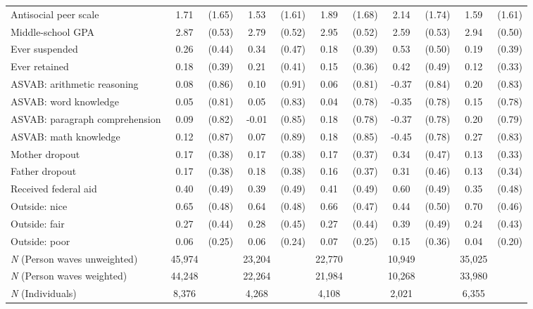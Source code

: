 {\begin{tabular}{l*{5}{cc}}
Antisocial peer scale&     1.71&   (1.65)&     1.53&   (1.61)&     1.89&   (1.68)&     2.14&   (1.74)&     1.59&   (1.61)\\
Middle-school GPA&     2.87&   (0.53)&     2.79&   (0.52)&     2.95&   (0.52)&     2.59&   (0.53)&     2.94&   (0.50)\\
Ever suspended  &     0.26&   (0.44)&     0.34&   (0.47)&     0.18&   (0.39)&     0.53&   (0.50)&     0.19&   (0.39)\\
Ever retained   &     0.18&   (0.39)&     0.21&   (0.41)&     0.15&   (0.36)&     0.42&   (0.49)&     0.12&   (0.33)\\
ASVAB: arithmetic reasoning&     0.08&   (0.86)&     0.10&   (0.91)&     0.06&   (0.81)&    -0.37&   (0.84)&     0.20&   (0.83)\\
ASVAB: word knowledge&     0.05&   (0.81)&     0.05&   (0.83)&     0.04&   (0.78)&    -0.35&   (0.78)&     0.15&   (0.78)\\
ASVAB: paragraph comprehension&     0.09&   (0.82)&    -0.01&   (0.85)&     0.18&   (0.78)&    -0.37&   (0.78)&     0.20&   (0.79)\\
ASVAB: math knowledge&     0.12&   (0.87)&     0.07&   (0.89)&     0.18&   (0.85)&    -0.45&   (0.78)&     0.27&   (0.83)\\
Mother dropout  &     0.17&   (0.38)&     0.17&   (0.38)&     0.17&   (0.37)&     0.34&   (0.47)&     0.13&   (0.33)\\
Father dropout  &     0.17&   (0.38)&     0.18&   (0.38)&     0.16&   (0.37)&     0.31&   (0.46)&     0.13&   (0.34)\\
Received federal aid&     0.40&   (0.49)&     0.39&   (0.49)&     0.41&   (0.49)&     0.60&   (0.49)&     0.35&   (0.48)\\
Outside: nice   &     0.65&   (0.48)&     0.64&   (0.48)&     0.66&   (0.47)&     0.44&   (0.50)&     0.70&   (0.46)\\
Outside: fair   &     0.27&   (0.44)&     0.28&   (0.45)&     0.27&   (0.44)&     0.39&   (0.49)&     0.24&   (0.43)\\
Outside: poor   &     0.06&   (0.25)&     0.06&   (0.24)&     0.07&   (0.25)&     0.15&   (0.36)&     0.04&   (0.20)\\
\midrule
\textit{N} (Person waves unweighted)&   45,974&         &   23,204&         &   22,770&         &   10,949&         &   35,025&         \\
\textit{N} (Person waves weighted)&   44,248&         &   22,264&         &   21,984&         &   10,268&         &   33,980&         \\
\textit{N} (Individuals)&    8,376&         &    4,268&         &    4,108&         &    2,021&         &    6,355&         \\
\bottomrule
\end{tabular}
}
